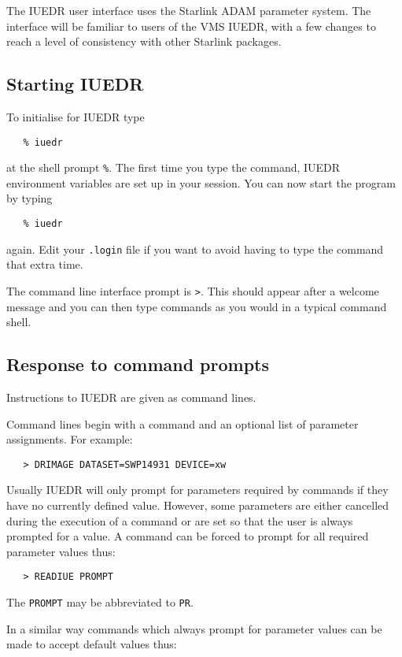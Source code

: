 The IUEDR user interface uses the Starlink ADAM parameter system.
The interface will be familiar to users of the VMS IUEDR, with a few changes
to reach a level of consistency with other Starlink packages.

\subsection {Starting IUEDR}

To initialise for IUEDR type
\begin{verbatim}
   % iuedr
\end{verbatim}

at the shell prompt \verb+%+.
The first time you type the command, IUEDR environment variables are set up in
your session.
You can now start the program by typing
\begin{verbatim}
   % iuedr
\end{verbatim}
again.
Edit your \verb+.login+ file if you want to avoid having to type the command
that extra time.

The command line interface prompt is \verb+>+\@.
This should appear after a welcome message and you can then type commands as
you would in a typical command shell.

\subsection {Response to command prompts}

Instructions to IUEDR are given as command lines.

Command lines begin with a command and an optional list of parameter
assignments. For example:
\begin{verbatim}
   > DRIMAGE DATASET=SWP14931 DEVICE=xw
\end{verbatim}

Usually IUEDR will only prompt for parameters required by commands if
they have no currently defined value.
However, some parameters are either cancelled during the execution of a
command or are set so that the user is always prompted for a value.
A command can be forced to prompt for all required parameter values thus:

\begin{verbatim}
   > READIUE PROMPT
\end{verbatim}

The \verb+PROMPT+ may be abbreviated to \verb+PR+\@.

In a similar way commands which always prompt for parameter values can be made
to accept default values thus:

